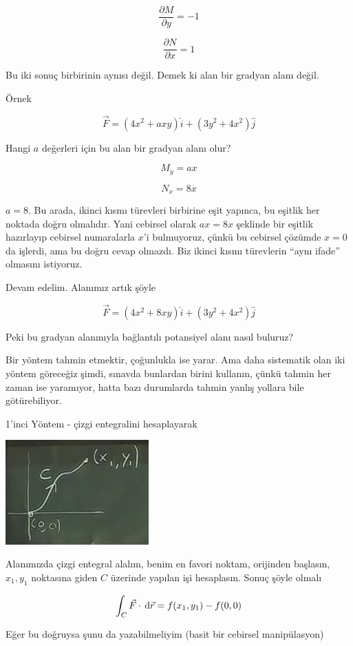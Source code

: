 \documentclass[12pt,fleqn]{article}\usepackage{../../common}
\begin{document}
$$ \frac{\partial M}{\partial y} = -1 $$

$$ \frac{\partial N}{\partial x} = 1 $$

Bu iki sonuç birbirinin aynısı değil. Demek ki alan bir gradyan alanı
değil. 

Örnek

$$ \vec{F} = (4x^2 + axy)\hat{i} + (3y^2 + 4x^2)\hat{j} $$

Hangi $a$ değerleri için bu alan bir gradyan alanı olur? 

$$ M_y = ax $$

$$ N_x = 8x $$

$a=8$. Bu arada, ikinci kısmı türevleri birbirine eşit yapınca, bu eşitlik her
noktada doğru olmalıdır. Yani cebirsel olarak $ax = 8x$ şeklinde bir eşitlik
hazırlayıp cebirsel numaralarla $x$'i bulmuyoruz, çünkü bu cebirsel çözümde
$x=0$ da işlerdi, ama bu doğru cevap olmazdı. Biz ikinci kısmı türevlerin ``aynı
ifade'' olmasını istiyoruz.

Devam edelim. Alanımız artık şöyle

$$ \vec{F} = (4x^2 + 8xy)\hat{i} + (3y^2 + 4x^2)\hat{j} $$

Peki bu gradyan alanınıyla bağlantılı potansiyel alanı nasıl buluruz? 

Bir yöntem tahmin etmektir, çoğunlukla ise yarar. Ama daha sistematik olan iki
yöntem göreceğiz şimdi, sınavda bunlardan birini kullanın, çünkü tahmin her
zaman ise yaramıyor, hatta bazı durumlarda tahmin yanlış yollara bile
götürebiliyor.

1'inci Yöntem - çizgi entegralini hesaplayarak 
\begin{center}
\includegraphics[height=4cm]{21_2.png}
\end{center}
Alanımızda çizgi entegral alalım, benim en favori noktam, orijinden
başlasın, $x_1,y_1$ noktasına giden $C$ üzerinde yapılan işi hesaplasın.
Sonuç şöyle olmalı

$$ \int_C \vec{F} \cdot \,\mathrm{d}\vec{r} = 
f(x_1,y_1) - f(0,0)
$$

Eğer bu doğruysa şunu da yazabilmeliyim (basit bir cebirsel manipülasyon)
\end{document}
